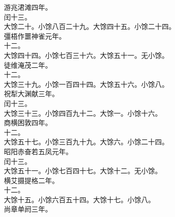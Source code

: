 \documentclass{zhvt-classic}
\begin{document}
\hspace*{2em}游兆涒滩四年。\\
\hspace*{2em}闰十三。\\
\hspace*{2em}大馀二十。小馀八百二十九。大馀四十五。小馀二十四。\\
\hspace*{2em}彊梧作噩神雀元年。\\
\hspace*{2em}十二。\\
\hspace*{2em}大馀四十四。小馀七百三十六。大馀五十一。无小馀。\\
\hspace*{2em}徒维淹茂二年。\\
\hspace*{2em}十二。\\
\hspace*{2em}大馀三十九。小馀一百四十四。大馀五十六。小馀八。\\
\hspace*{2em}祝犁大渊献三年。\\
\hspace*{2em}闰十三。\\
\hspace*{2em}大馀三十三。小馀四百九十二。大馀一。小馀十六。\\
\hspace*{2em}商横困敦四年。\\
\hspace*{2em}十二。\\
\hspace*{2em}大馀五十七。小馀三百九十九。大馀六。小馀二十四。\\
\hspace*{2em}昭阳赤奋若五凤元年。\\
\hspace*{2em}闰十三。\\
\hspace*{2em}大馀五十一。小馀七百四十七。大馀十二。无小馀。\\
\hspace*{2em}横艾摄提格二年。\\
\hspace*{2em}十二。\\
\hspace*{2em}大馀十五。小馀六百五十四。大馀十七。小馀八。\\
\hspace*{2em}尚章单阏三年。\\
\end{document}

